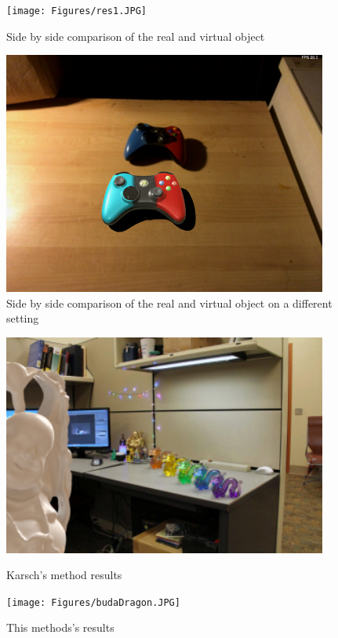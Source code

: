 \begin{figure}[H]
    \centering
    \begin{minipage}{0.45\textwidth}
        \centering
        \texttt{[image: Figures/res1.JPG]} %
        \caption{Side by side comparison of the real and virtual object}
    \end{minipage}\hfill
    \begin{minipage}{0.45\textwidth}
        \centering
        \includegraphics[width=0.95\textwidth]{Figures/rest5.JPG} %
        \caption{Side by side comparison of the real and virtual object on a different setting}
    \end{minipage}
\end{figure}

\begin{figure}[H]
    \centering
    \begin{minipage}{0.45\textwidth}
        \centering
        \includegraphics[width=0.95\textwidth]{Figures/budaDragonKarsch.jpg} %
        \caption{Karsch's method results}
    \end{minipage}\hfill
    \begin{minipage}{0.45\textwidth}
        \centering
        \texttt{[image: Figures/budaDragon.JPG]} %
        \caption{This methods's results}
    \end{minipage}
\end{figure}

